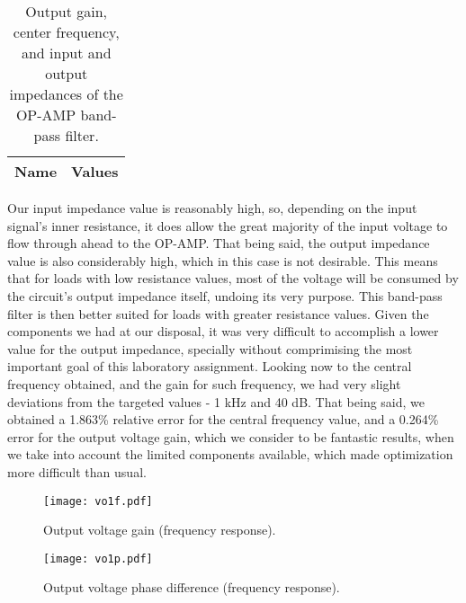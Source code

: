 \begin{table}[h]
  \centering
  \begin{tabular}{|l|r|}
    \hline    
    {\bf Name} & {\bf Values} \\ \hline
    
         
  \end{tabular}
  \caption{Output gain, center frequency, and input and output impedances of the OP-AMP band-pass filter.}
  \label{tab:main}
\end{table}

Our input impedance value is reasonably high, so, depending on the input signal's inner resistance, it does allow the great majority of the input voltage to flow through ahead to the OP-AMP. That being said, the output impedance value is also considerably high, which in this case is not desirable. This means that for loads with low resistance values, most of the voltage will be consumed by the circuit's output impedance itself, undoing its very purpose. This band-pass filter is then better suited for loads with greater resistance values. Given the components we had at our disposal, it was very difficult to accomplish a lower value for the output impedance, specially without comprimising the most important goal of this laboratory assignment.
Looking now to the central frequency obtained, and the gain for such frequency, we had very slight deviations from the targeted values - 1 kHz and 40 dB. That being said, we obtained a 1.863\% relative error for the central frequency value, and a 0.264\% error for the output voltage gain, which we consider to be fantastic results, when we take into account the limited components available, which made optimization more difficult than usual.

\begin{figure}[!h] \centering
\texttt{[image: vo1f.pdf]}
\caption{Output voltage gain (frequency response).}
\label{fig:gainstage}
\end{figure}

\begin{figure}[!h] \centering
\texttt{[image: vo1p.pdf]}
\caption{Output voltage phase difference (frequency response).}
\label{fig:outputstage}
\end{figure}


